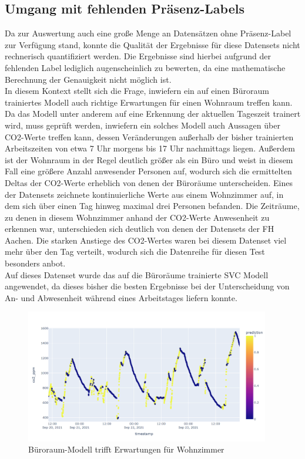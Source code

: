 \subsection{Umgang mit fehlenden Präsenz-Labels}
Da zur Auswertung auch eine große Menge an Datensätzen ohne Präsenz-Label zur Verfügung stand, konnte die 
Qualität der Ergebnisse für diese Datensets nicht rechnerisch quantifiziert werden. Die Ergebnisse
sind hierbei aufgrund der fehlenden Label lediglich augenscheinlich zu bewerten, da eine mathematische
Berechnung der Genauigkeit nicht möglich ist.\\
In diesem Kontext stellt sich die Frage, inwiefern ein auf einen Büroraum trainiertes Modell auch richtige
Erwartungen für einen Wohnraum treffen kann.
Da das Modell unter anderem auf eine Erkennung der aktuellen Tageszeit trainert wird, muss geprüft
werden, inwiefern ein solches Modell auch Aussagen über CO2-Werte treffen kann, dessen Veränderungen außerhalb
der bisher trainierten Arbeitszeiten von etwa 7 Uhr morgens bis 17 Uhr nachmittags liegen. 
Außerdem ist der Wohnraum in der Regel deutlich größer als ein Büro und weist in diesem Fall eine größere Anzahl 
anwesender Personen auf, wodurch sich die ermittelten Deltas der CO2-Werte erheblich von denen der Büroräume 
unterscheiden.
\newpage
Eines der Datensets zeichnete kontinuierliche Werte aus einem Wohnzimmer auf, in dem sich über einen 
Tag hinweg maximal drei Personen befanden. Die Zeiträume, zu denen in diesem Wohnzimmer anhand der CO2-Werte
Anwesenheit zu erkennen war, unterschieden sich deutlich von denen der Datensets der FH Aachen. Die 
starken Anstiege des CO2-Wertes waren bei diesem Datenset viel mehr über den Tag verteilt, wodurch sich die 
Datenreihe für diesen Test besonders anbot.\\
Auf dieses Datenset wurde das auf die Büroräume trainierte  SVC Modell angewendet, da dieses bisher die 
besten Ergebnisse bei der Unterscheidung von An- und Abwesenheit während eines Arbeitstages liefern konnte. 

\begin{figure}[h]
    \centering
    \includegraphics[width=0.95\textwidth]{pic/h217_predicting_livingroom.png}
    \caption{Büroraum-Modell trifft Erwartungen für Wohnzimmer}
    \label{fig:pred_livingroom}
\end{figure}

